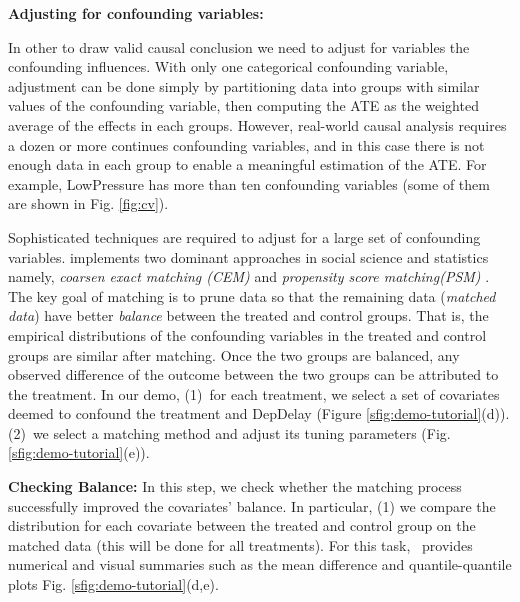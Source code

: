  {\bf Adjusting for confounding variables:} {
In other to draw valid causal conclusion we need to adjust for variables the confounding influences.
 With only one categorical confounding variable, adjustment can be
 done simply by partitioning data into
 groups with similar values of the confounding variable, then
 computing the ATE as the weighted average of the effects in each groups.  However, real-world causal analysis requires a dozen or more continues confounding
 variables, and in this case there is not enough data in each group to enable a meaningful estimation of the ATE.
 For example, LowPressure has more than ten confounding variables
 (some of them are shown in Fig. \ref{fig:cv}).

 Sophisticated techniques are required to adjust for a large set of confounding variables. \GSQL
 implements two dominant approaches in social science and statistics namely,
  {\em coarsen exact matching (CEM)} and {\it propensity score matching(PSM)} 
 \cite{Rubin1983b,IacKinPor09,rosenbaum1984reducing}. 
 The key goal of matching is to prune data so that
the remaining data ({\em matched data}) have better \emph{balance}
between the treated and control groups. That is, the empirical
distributions of the confounding variables in the treated and control
groups are similar after matching.
Once the two groups are balanced, any observed difference of the
outcome between the two groups can be attributed to the treatment. In
our demo, (1)\ for each treatment, we select a set of covariates deemed to confound the treatment and DepDelay (Figure \ref{sfig:demo-tutorial}(d)).
  (2)\ we select a matching method and adjust its tuning parameters (Fig. \ref{sfig:demo-tutorial}(e)).



{\bf Checking Balance:}  In this step, we check whether the
matching process  successfully improved the covariates' balance. In particular,
(1)  we compare the distribution for each covariate between the
 treated and control group on the matched data
 (this will be done for all treatments). For this task, \GSQL\  provides
 numerical and visual summaries such as the mean difference and quantile-quantile plots
  Fig. \ref{sfig:demo-tutorial}(d,e). 


}
